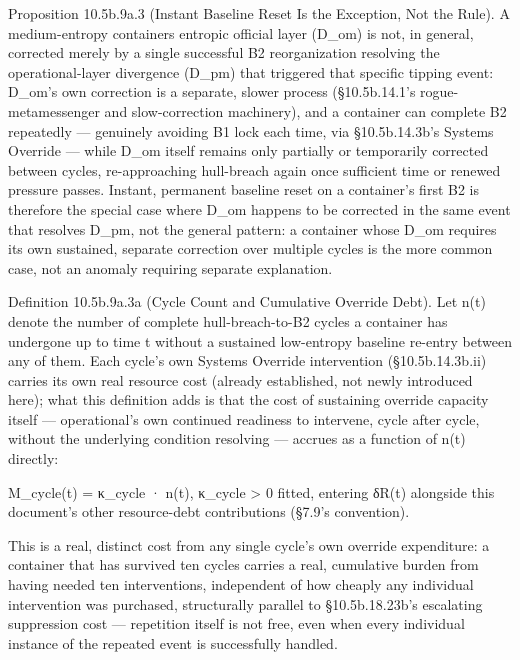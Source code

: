\documentclass[
]{article}
\begin{document}
Proposition 10.5b.9a.3 (Instant Baseline Reset Is the Exception, Not the
Rule). A medium-entropy containers entropic official layer (D\_om) is
not, in general, corrected merely by a single successful B2
reorganization resolving the operational-layer divergence (D\_pm) that
triggered that specific tipping event: D\_om's own correction is a
separate, slower process (§10.5b.14.1's rogue-metamessenger and
slow-correction machinery), and a container can complete B2 repeatedly
--- genuinely avoiding B1 lock each time, via §10.5b.14.3b's Systems
Override --- while D\_om itself remains only partially or temporarily
corrected between cycles, re-approaching hull-breach again once
sufficient time or renewed pressure passes. Instant, permanent baseline
reset on a container's first B2 is therefore the special case where
D\_om happens to be corrected in the same event that resolves D\_pm, not
the general pattern: a container whose D\_om requires its own sustained,
separate correction over multiple cycles is the more common case, not an
anomaly requiring separate explanation.

Definition 10.5b.9a.3a (Cycle Count and Cumulative Override Debt). Let
n(t) denote the number of complete hull-breach-to-B2 cycles a container
has undergone up to time t without a sustained low-entropy baseline
re-entry between any of them. Each cycle's own Systems Override
intervention (§10.5b.14.3b.ii) carries its own real resource cost
(already established, not newly introduced here); what this definition
adds is that the cost of sustaining override capacity itself ---
operational's own continued readiness to intervene, cycle after cycle,
without the underlying condition resolving --- accrues as a function of
n(t) directly:

M\_cycle(t) = κ\_cycle · n(t), κ\_cycle \textgreater{} 0 fitted,
entering δR(t) alongside this document's other resource-debt
contributions (§7.9's convention).

This is a real, distinct cost from any single cycle's own override
expenditure: a container that has survived ten cycles carries a real,
cumulative burden from having needed ten interventions, independent of
how cheaply any individual intervention was purchased, structurally
parallel to §10.5b.18.23b's escalating suppression cost --- repetition
itself is not free, even when every individual instance of the repeated
event is successfully handled.
\end{document}
